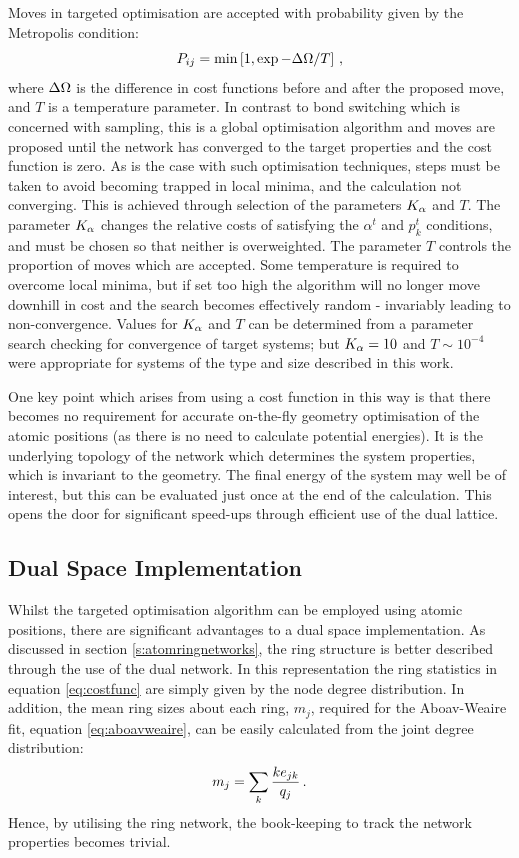 Moves in targeted optimisation are accepted with probability given by the Metropolis condition:
\begin{equation}
	P_{ij}=\min\left[1,\exp{-\Delta\Omega/T}\right]\,,
\end{equation}
where $\Delta\Omega$ is the difference in cost functions before and after the proposed move, and $T$ is a temperature parameter. 
In contrast to bond switching which is concerned with sampling, this is a global optimisation algorithm and moves are proposed until the network has converged to the target properties and the cost function is zero.
As is the case with such optimisation techniques, steps must be taken to avoid becoming trapped in local minima, and the calculation not converging. 
This is achieved through selection of the parameters $K_\alpha$ and $T$. 
The parameter $K_\alpha$ changes the relative costs of satisfying the $\alpha^t$ and $p_k^t$ conditions, and must be chosen so that neither is overweighted. The parameter $T$ controls the proportion of moves which are accepted. 
Some temperature is required to overcome local minima, but if set too high the algorithm will no longer move downhill in cost and the search becomes effectively random \-- invariably leading to non\--convergence. 
Values for $K_\alpha$ and $T$ can be determined from a parameter search checking for convergence of target systems; but $K_\alpha=10$ and $T\sim 10^{-4}$ were appropriate for systems of the type and size described in this work. 

One key point which arises from using a cost function in this way is that there becomes no requirement for accurate on\--the\--fly geometry optimisation of the atomic positions (as there is no need to calculate potential energies).
It is the underlying topology of the network which determines the system properties, which is invariant to the geometry.
The final energy of the system may well be of interest, but this can be evaluated just once at the end of the calculation.
This opens the door for significant speed\--ups through efficient use of the dual lattice.

\subsection{Dual Space Implementation}

Whilst the targeted optimisation algorithm can be employed using atomic positions, there are significant advantages to a dual space implementation.
As discussed in section \ref{s:atomringnetworks}, the ring structure is better described through the use of the dual network. 
In this representation the ring statistics in equation \eqref{eq:costfunc} are simply given by the node degree distribution. 
In addition, the mean ring sizes about each ring, $m_j$, required for the Aboav\--Weaire fit, equation \eqref{eq:aboavweaire}, can be easily calculated from the joint degree distribution:
\begin{equation}
	\label{eq:mjejklink}
	m_j = \sum\limits_k \frac{ke_{jk}}{q_j}\,.
\end{equation}
Hence, by utilising the ring network, the book\--keeping to track the network properties becomes trivial.


